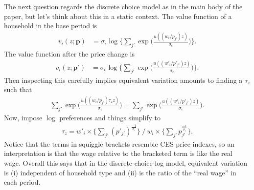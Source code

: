 \documentclass[12pt,pdftex]{article}
\begin{document}
\begin{onehalfspacing}
The next question regards the discrete choice model as in the main body of the paper, but let's think about this in a static context. The value function of a household in the base period is
\begin{align}
v_i(z ; \mathbf{p}) & = \sigma_{\epsilon} \log \bigg \{ \sum_{j'} \exp \bigg ( \frac{u( (w_i / p_{j'}) z )}{\sigma_{\epsilon}} \bigg ) \bigg \}.
\end{align}
The value function after the price change is
\begin{align}
v_i(z ; \mathbf{p'}) & = \sigma_{\epsilon} \log \bigg \{ \sum_{j'} \exp \bigg ( \frac{u( (w'_i / p'_{j'}) z )}{\sigma_{\epsilon}} \bigg ) \bigg \}.
\end{align}
Then inspecting this carefully implies equivalent variation amounts to finding a $\tau_{z}$ such that
\begin{align}
\sum_{j'} \exp \bigg ( \frac{u( (w_i / p_{j'}) \tau_{z} z )}{\sigma_{\epsilon}} \bigg ) = \sum_{j'} \exp \bigg ( \frac{u( (w'_i / p'_{j'}) z )}{\sigma_{\epsilon}} \bigg ).
\end{align}
Now, impose $\log$ preferences and things simplify to
\begin{align}
\tau_{z} = w'_i \times \bigg \{ \sum_{j'}  ( p'_{j'} )^{\frac{-1}{\sigma_{\epsilon}}} \bigg \} \ \bigg /  \ w_i \times \bigg  \{ \sum_{j'}  p^{\frac{-1}{\sigma_{\epsilon}}}_{j'} \bigg \}.
\end{align}
Notice that the terms in squiggle brackets resemble CES price indexes, so an interpretation is that the wage relative to the bracketed term is like the real wage. Overall this says that in the discrete-choice-log model, equivalent variation is (i) independent of household type and (ii) is the ratio of the ``real wage'' in each period.


\end{onehalfspacing}
\end{document}
